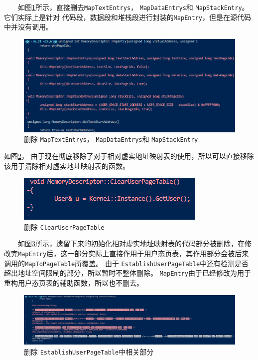 　　如图\ref{deleteEntry}所示，直接删去\texttt{MapTextEntrys}， \texttt{MapDataEntrys}和 \texttt{MapStackEntry}。它们实际上是针对
代码段，数据段和堆栈段进行封装的\texttt{MapEntry}，但是在源代码中并没有调用。

\begin{figure}[!htbp]
    \centering
    \includegraphics[width=\textwidth]{images/deleteEntry.png}
    \caption{删除 \texttt{MapTextEntrys}， \texttt{MapDataEntrys}和 \texttt{MapStackEntry}}\label{deleteEntry}
\end{figure}

如图\ref{deleteClearUserPageTable}，
由于现在彻底移除了对于相对虚实地址映射表的使用，所以可以直接移除该用于清除相对虚实地址映射表的函数。

\begin{figure}[!htbp]
    \centering
    \includegraphics[scale=1]{images/deleteClearUserPageTable.png}
    \caption{删除 \texttt{ClearUserPageTable}}\label{deleteClearUserPageTable}
\end{figure}

　　如图\ref{deleteEstablishUserPageTable}所示，遗留下来的初始化相对虚实地址映射表的代码部分被删除，在修改完\texttt{MapEntry}后，这一部分实际上直接作用于用户态页表，其作用部分会被后来调用的\texttt{MapToPageTable}所覆盖。
由于 \texttt{EstablishUserPageTable}中还有检测是否超出地址空间限制的部分，所以暂时不整体删除。
\texttt{MapEntry}由于已经修改为用于重构用户态页表的辅助函数，所以也不删去。

\begin{figure}[!htbp]
    \centering
    \includegraphics[width=\textwidth]{images/deleteEstablishUserPageTable.png}
    \caption{删除 \texttt{EstablishUserPageTable}中相关部分}\label{deleteEstablishUserPageTable}
\end{figure}



